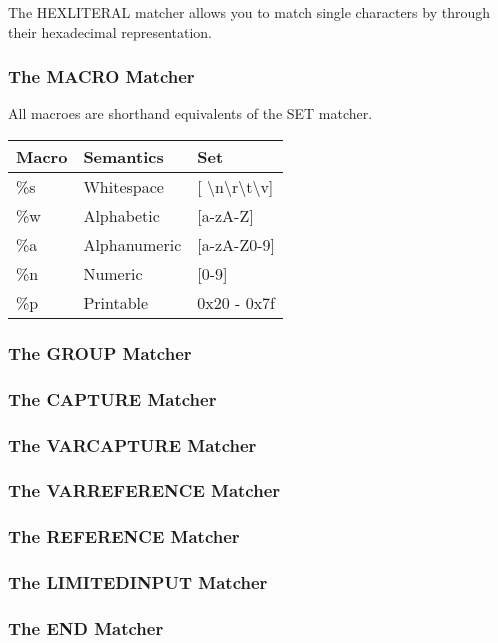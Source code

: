 The HEXLITERAL matcher allows you to match single characters by
through their hexadecimal representation.

\subsubsection{The MACRO Matcher}

All macroes are shorthand equivalents of the SET matcher.

\begin{center}
\label{tab:naig_macroes}
\begin{longtable}{lll}
\textbf{Macro} & \textbf{Semantics} & \textbf{Set} \\
\endhead
\%s & Whitespace & [ \textbackslash n\textbackslash r\textbackslash t\textbackslash v] \\
\%w & Alphabetic & [a-zA-Z] \\
\%a & Alphanumeric & [a-zA-Z0-9] \\
\%n & Numeric & [0-9] \\
\%p & Printable & 0x20 - 0x7f \\
\end{longtable}
\end{center}

\subsubsection{The GROUP Matcher}

\subsubsection{The CAPTURE Matcher}

\subsubsection{The VARCAPTURE Matcher}

\subsubsection{The VARREFERENCE Matcher}

\subsubsection{The REFERENCE Matcher}

\subsubsection{The LIMITEDINPUT Matcher}

\subsubsection{The END Matcher}

